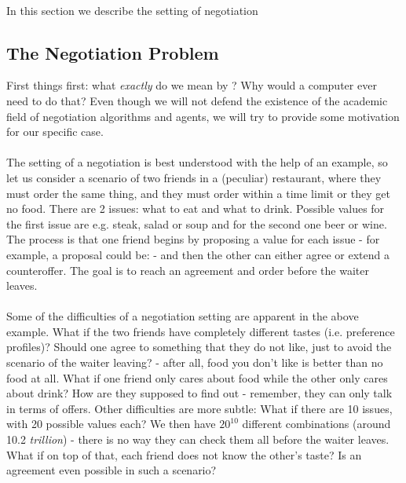 
\paragraph*{}
In this section we describe the setting of negotiation 

\subsection{The Negotiation Problem}	\label{sec:introduction.the_negotiation_problem}	%
    First things first: what \emph{exactly} do we mean by ? Why would a computer ever need to do that? Even though we will not defend the existence of the academic field of negotiation algorithms and agents, we will try to provide some motivation for our specific case.	%

    \paragraph*{}
        The setting of a negotiation is best understood with the help of an example, so let us consider a scenario of two friends in a (peculiar) restaurant, where they must order the same thing, and they must order within a time limit or they get no food. There are 2 issues: what to eat and what to drink. Possible values for the first issue are e.g. steak, salad or soup and for the second one beer or wine. The process is that one friend begins by proposing a value for each issue - for example, a proposal could be:  - and then the other can either agree or extend a counteroffer. The goal is to reach an agreement and order before the waiter leaves.
    
    \paragraph*{}
        Some of the difficulties of a negotiation setting are apparent in the above example. What if the two friends have completely different tastes (i.e. preference profiles)? Should one agree to something that they do not like, just to avoid the scenario of the waiter leaving? - after all, food you don't like is better than no food at all. What if one friend only cares about food while the other only cares about drink? How are they supposed to find out - remember, they can only talk in terms of offers.
        Other difficulties are more subtle: What if there are 10 issues, with 20 possible values each? We then have $20^{10}$ different combinations (around 10.2 \emph{trillion}) - there is no way they can check them all before the waiter leaves. What if on top of that, each friend does not know the other's taste? Is an agreement even possible in such a scenario?

